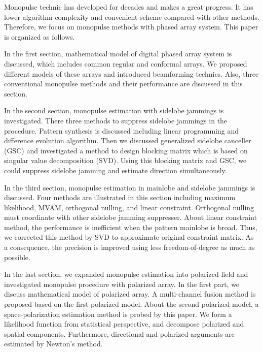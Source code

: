 \documentclass[master]{thesis-uestc}
\begin{document}
\begin{englishabstract}
Monopulse technic has developed for decades and makes a great progress.  
It has lower algorithm complexity and convenient scheme compared with other methods.  
Therefore, we focus on monopulse methods with phased array system.  
This paper is organized as follows.

In the first section, mathematical model of digital phased array system is discussed, 
which includes common regular and conformal arrays.  We proposed different models of these arrays 
and introduced beamforming technics.  Also, three conventional monopulse methods and their performance 
are discussed in this section.

In the second section, monopulse estimation with sidelobe jammings is investigated.  
There three methods to suppress sidelobe jammings in the procedure.  
Pattern synthesis is discussed including linear programming and difference evolution algorithm.  
Then we discussed generalized sidelobe canceller (GSC) and investigated a method to design blocking matrix 
which is based on singular value decomposition (SVD).  Using this blocking matrix and GSC, we could 
suppress sidelobe jamming and estimate direction simultaneously.

In the third section, monopulse estimation in mainlobe and sidelobe jammings is discussed.  
Four methods are illustrated in this section including maximum likelihood, MVAM, orthogonal nulling, 
and linear constraint.  Orthogonal nulling must coordinate with other sidelobe jamming suppresser.  
About linear constraint method, the performance is inefficient 
when the pattern mainlobe is broad. Thus, we corrected this method by SVD to approximate original constraint matrix.  
As a consequence, the precision is improved using less freedom-of-degree as much as possible.

In the last section, we expanded monopulse estimation into polarized field and investigated monopulse procedure 
with polarized array.  In the first part, we discuss mathematical model of polarized array.  
A multi-channel fusion method is proposed based on the first polarized model.  
About the second polarized model, a space-polarization estimation method is probed by this paper.  
We form a likelihood function from statistical perspective, and decompose polarized and spatial components.  
Furthermore, directional and polarized arguments are estimated by Newton's method.

\end{englishabstract}
\end{document}
